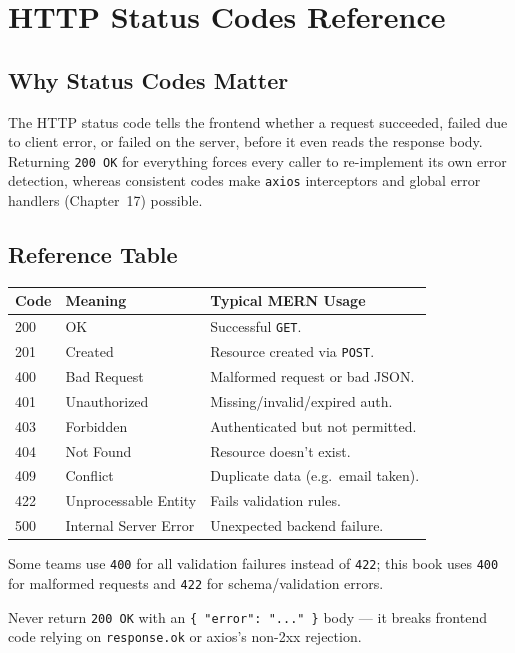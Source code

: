 \chapter{HTTP Status Codes Reference}

\section{Why Status Codes Matter}

The HTTP status code tells the frontend whether a request succeeded, failed
due to client error, or failed on the server, before it even reads the
response body. Returning \texttt{200 OK} for everything forces every caller
to re-implement its own error detection, whereas consistent codes make
\texttt{axios} interceptors and global error handlers (Chapter~17) possible.

\section{Reference Table}

\begin{table}[h]
\centering
\begin{tabularx}{\textwidth}{l l X}
\toprule
\textbf{Code} & \textbf{Meaning} & \textbf{Typical MERN Usage} \\
\midrule
200 & OK & Successful \texttt{GET}. \\
201 & Created & Resource created via \texttt{POST}. \\
400 & Bad Request & Malformed request or bad JSON. \\
401 & Unauthorized & Missing/invalid/expired auth. \\
403 & Forbidden & Authenticated but not permitted. \\
404 & Not Found & Resource doesn't exist. \\
409 & Conflict & Duplicate data (e.g.\ email taken). \\
422 & Unprocessable Entity & Fails validation rules. \\
500 & Internal Server Error & Unexpected backend failure. \\
\bottomrule
\end{tabularx}
\end{table}

\begin{notebox}[NOTE]
Some teams use \texttt{400} for all validation failures instead of
\texttt{422}; this book uses \texttt{400} for malformed requests and
\texttt{422} for schema/validation errors.
\end{notebox}

\begin{warnbox}[WARNING]
Never return \texttt{200 OK} with an \texttt{\{ "error": "..." \}} body ---
it breaks frontend code relying on \texttt{response.ok} or axios's
non-2xx rejection.
\end{warnbox}
